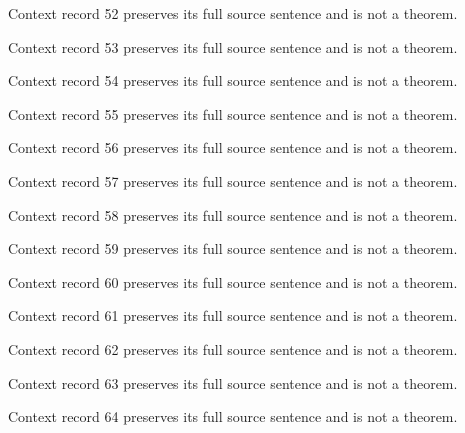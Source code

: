 \documentclass{article}
\begin{document}
\begin{remark}\label{train:context:52}Context record 52 preserves its full source sentence and is not a theorem.\end{remark}
\begin{remark}\label{train:context:53}Context record 53 preserves its full source sentence and is not a theorem.\end{remark}
\begin{remark}\label{train:context:54}Context record 54 preserves its full source sentence and is not a theorem.\end{remark}
\begin{remark}\label{train:context:55}Context record 55 preserves its full source sentence and is not a theorem.\end{remark}
\begin{remark}\label{train:context:56}Context record 56 preserves its full source sentence and is not a theorem.\end{remark}
\begin{remark}\label{train:context:57}Context record 57 preserves its full source sentence and is not a theorem.\end{remark}
\begin{remark}\label{train:context:58}Context record 58 preserves its full source sentence and is not a theorem.\end{remark}
\begin{remark}\label{train:context:59}Context record 59 preserves its full source sentence and is not a theorem.\end{remark}
\begin{remark}\label{train:context:60}Context record 60 preserves its full source sentence and is not a theorem.\end{remark}
\begin{remark}\label{train:context:61}Context record 61 preserves its full source sentence and is not a theorem.\end{remark}
\begin{remark}\label{train:context:62}Context record 62 preserves its full source sentence and is not a theorem.\end{remark}
\begin{remark}\label{train:context:63}Context record 63 preserves its full source sentence and is not a theorem.\end{remark}
\begin{remark}\label{train:context:64}Context record 64 preserves its full source sentence and is not a theorem.\end{remark}
\end{document}
